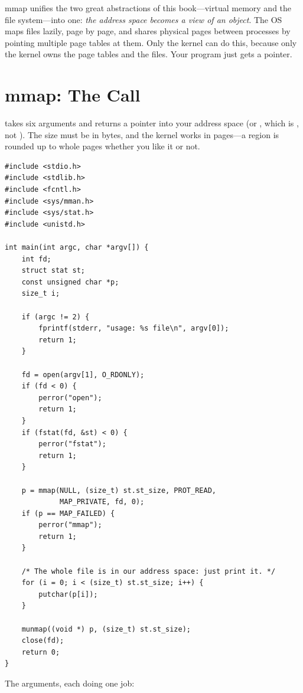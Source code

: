 \begin{osconcept}
mmap unifies the two great abstractions of this book---virtual memory
and the file system---into one: \emph{the address space becomes a view
of an object}. The OS maps files lazily, page by page, and shares
physical pages between processes by pointing multiple page tables at
them. Only the kernel can do this, because only the kernel owns the
page tables and the files. Your program just gets a pointer.
\end{osconcept}

\section{mmap: The Call}

 takes six arguments and returns a pointer into your address
space (or , which is , not
). The size must be in bytes, and the kernel works in
pages---a region is rounded up to whole pages whether you like it or
not.

\begin{lstlisting}[caption={Reading a whole file by mapping it.}]
#include <stdio.h>
#include <stdlib.h>
#include <fcntl.h>
#include <sys/mman.h>
#include <sys/stat.h>
#include <unistd.h>

int main(int argc, char *argv[]) {
    int fd;
    struct stat st;
    const unsigned char *p;
    size_t i;

    if (argc != 2) {
        fprintf(stderr, "usage: %s file\n", argv[0]);
        return 1;
    }

    fd = open(argv[1], O_RDONLY);
    if (fd < 0) {
        perror("open");
        return 1;
    }
    if (fstat(fd, &st) < 0) {
        perror("fstat");
        return 1;
    }

    p = mmap(NULL, (size_t) st.st_size, PROT_READ,
             MAP_PRIVATE, fd, 0);
    if (p == MAP_FAILED) {
        perror("mmap");
        return 1;
    }

    /* The whole file is in our address space: just print it. */
    for (i = 0; i < (size_t) st.st_size; i++) {
        putchar(p[i]);
    }

    munmap((void *) p, (size_t) st.st_size);
    close(fd);
    return 0;
}
\end{lstlisting}

The arguments, each doing one job:

